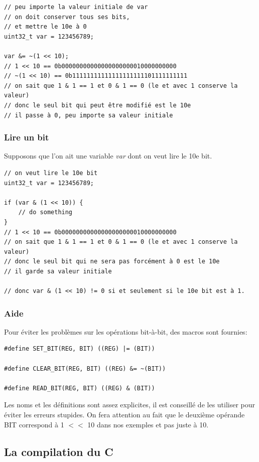 \documentclass[a4paper,10pt]{article} %
\begin{document}
\begin{lstlisting}[frame=single]
// peu importe la valeur initiale de var
// on doit conserver tous ses bits,
// et mettre le 10e à 0
uint32_t var = 123456789;

var &= ~(1 << 10);
// 1 << 10 == 0b00000000000000000000010000000000
// ~(1 << 10) == 0b11111111111111111111101111111111
// on sait que 1 & 1 == 1 et 0 & 1 == 0 (le et avec 1 conserve la valeur)
// donc le seul bit qui peut être modifié est le 10e
// il passe à 0, peu importe sa valeur initiale
\end{lstlisting}

\subsubsection{Lire un bit}
Supposons que l'on ait une variable \textit{var} dont on veut lire le 10e bit.

\begin{lstlisting}[frame=single]
// on veut lire le 10e bit
uint32_t var = 123456789;

if (var & (1 << 10)) {
    // do something
}
// 1 << 10 == 0b00000000000000000000010000000000
// on sait que 1 & 1 == 1 et 0 & 1 == 0 (le et avec 1 conserve la valeur)
// donc le seul bit qui ne sera pas forcément à 0 est le 10e
// il garde sa valeur initiale

// donc var & (1 << 10) != 0 si et seulement si le 10e bit est à 1.
\end{lstlisting}

\subsubsection{Aide}
Pour éviter les problèmes sur les opérations bit-à-bit, des macros sont fournies:

\begin{lstlisting}[frame=single]
#define SET_BIT(REG, BIT) ((REG) |= (BIT))

#define CLEAR_BIT(REG, BIT) ((REG) &= ~(BIT))

#define READ_BIT(REG, BIT) ((REG) & (BIT))
\end{lstlisting}

Les noms et les définitions sont assez explicites, il est conseillé de les utiliser pour éviter les erreurs stupides. On fera attention au fait que le deuxième opérande BIT correspond à 1 $<<$ 10 dans nos exemples et pas juste à 10.

\subsection{La compilation du C}
\end{document}
